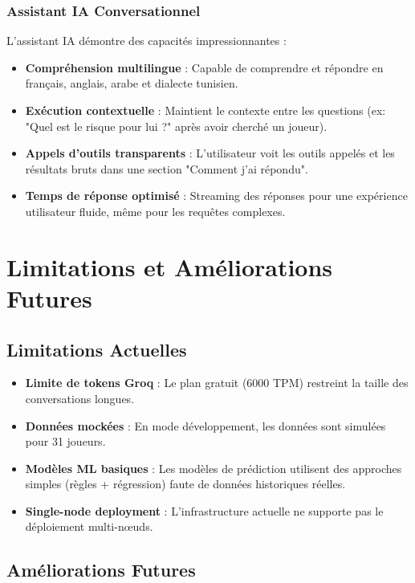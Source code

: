 \subsubsection{Assistant IA Conversationnel}

L'assistant IA démontre des capacités impressionnantes :

\begin{itemize}
    \item \textbf{Compréhension multilingue} : Capable de comprendre et répondre en français, anglais, arabe et dialecte tunisien.
    \item \textbf{Exécution contextuelle} : Maintient le contexte entre les questions (ex: "Quel est le risque pour lui ?" après avoir cherché un joueur).
    \item \textbf{Appels d'outils transparents} : L'utilisateur voit les outils appelés et les résultats bruts dans une section "Comment j'ai répondu".
    \item \textbf{Temps de réponse optimisé} : Streaming des réponses pour une expérience utilisateur fluide, même pour les requêtes complexes.
\end{itemize}

\section{Limitations et Améliorations Futures}

\subsection{Limitations Actuelles}

\begin{itemize}
    \item \textbf{Limite de tokens Groq} : Le plan gratuit (6000 TPM) restreint la taille des conversations longues.
    \item \textbf{Données mockées} : En mode développement, les données sont simulées pour 31 joueurs.
    \item \textbf{Modèles ML basiques} : Les modèles de prédiction utilisent des approches simples (règles + régression) faute de données historiques réelles.
    \item \textbf{Single-node deployment} : L'infrastructure actuelle ne supporte pas le déploiement multi-nœuds.
\end{itemize}

\subsection{Améliorations Futures}

